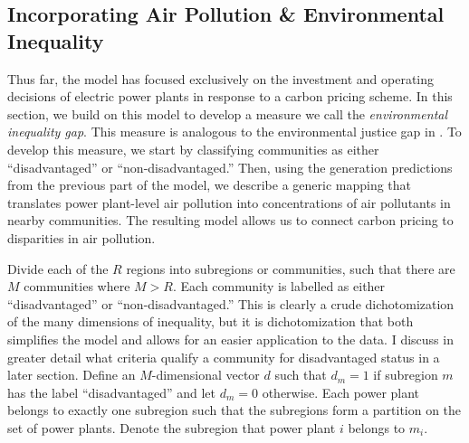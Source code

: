 



\subsection{Incorporating Air Pollution \& Environmental Inequality}

Thus far, the model has focused exclusively on the investment and operating decisions of electric power plants in response to a carbon pricing scheme. In this section, we build on this model to develop a measure we call the \emph{environmental inequality gap}. This measure is analogous to the environmental justice gap in \cite{hernandez2023environmental}. To develop this measure, we start by classifying communities as either ``disadvantaged'' or ``non-disadvantaged.'' Then, using the generation predictions from the previous part of the model, we describe a generic mapping that translates power plant-level air pollution into concentrations of air pollutants in nearby communities. The resulting model allows us to connect carbon pricing to disparities in air pollution. 

Divide each of the $R$ regions into subregions or communities, such that there are $M$ communities where $M > R$. Each community is labelled as either ``disadvantaged'' or ``non-disadvantaged.'' This is clearly a crude dichotomization of the many dimensions of inequality, but it is dichotomization that both simplifies the model and allows for an easier application to the data. I discuss in greater detail what criteria qualify a community for disadvantaged status in a later section. Define an $M$-dimensional vector $d$ such that $d_m = 1$ if subregion $m$ has the label ``disadvantaged'' and let $d_m = 0$ otherwise. Each power plant belongs to exactly one subregion such that the subregions form a partition on the set of power plants. Denote the subregion that power plant $i$ belongs to $m_i$.

